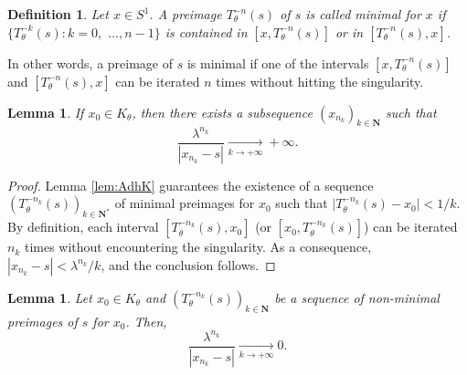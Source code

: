 \documentclass[11pt]{article}
\newtheorem{lemma}[thm]{Lemma}
\newtheorem*{definition}{Definition}
\begin{document}
\begin{definition}
    Let $x\in S^{1}$. A preimage $T_{\theta}^{-n}(s)$ of $s$ is called minimal for $x$ if $\{T_{\theta}^{-k}(s):k=0,$ $\dots,n-1\}$ is contained in $[x,T_{\theta}^{-n}(s)]$ or in $[T_{\theta}^{-n}(s),x]$.
\end{definition}

In other words, a preimage of $s$ is minimal if one of the intervals $[x,T_{\theta}^{-n}(s)]$ and $[T_{\theta}^{-n}(s),x]$ can be iterated $n$ times without hitting the singularity.

\begin{lemma}
\label{lem:exist_infty}
    If $x_{0}\in K_{\theta}$, then there exists a subsequence $(x_{n_{k}})_{k\in\mathbf{N}}$ such that
    \[
    \frac{\lambda^{n_{k}}}{\left\lvert x_{n_{k}}-s\right\rvert}\xrightarrow[k\rightarrow+\infty]{}+\infty.
    \]
\end{lemma}

\begin{proof}
    Lemma \ref{lem:AdhK} guarantees the existence of a sequence $(T_{\theta}^{-n_{k}}(s))_{k\in\mathbf{N}^{*}}$ of minimal preimages for $x_{0}$ such that $\lvert T_{\theta}^{-n_{k}}(s)-x_{0}\rvert<1/k$. By definition, each interval $[T_{\theta}^{-n_{k}}(s),x_{0}]$ (or $[x_{0},T_{\theta}^{-n_{k}}(s)]$) can be iterated $n_{k}$ times without encountering the singularity. As a consequence, $\left\lvert x_{n_{k}}-s\right\rvert<\lambda^{n_{k}}/k$, and the conclusion follows.
\end{proof}

\begin{lemma}
\label{lem:Preim_non_min}
    Let $x_{0}\in K_{\theta}$ and $(T_{\theta}^{-n_{k}}(s))_{k\in\mathbf{N}}$ be a sequence of non-minimal preimages of $s$ for $x_{0}$. Then,
    \[
    \frac{\lambda^{n_{k}}}{\left\lvert x_{n_{k}}-s\right\rvert}\xrightarrow[k\rightarrow+\infty]{}0.
    \]
\end{lemma}
\end{document}
